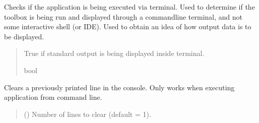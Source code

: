 \documentclass[letterpaper,10pt,english]{sphinxmanual}
\begin{document}
\begin{fulllineitems}
\label{\detokenize{modules/simulation/display:qnav.simulation.display.is_using_terminal}}
\pysigstartsignatures
{}
\pysigstopsignatures
\sphinxAtStartPar
Checks if the application is being executed via terminal.
Used to determine if the toolbox is being run and displayed through a
command\sphinxhyphen{}line terminal, and not some interactive shell (or IDE). Used to
obtain an idea of how output data is to be displayed.
\begin{quote}\begin{description}
\sphinxAtStartPar
True if standard output is being displayed inside terminal.

\sphinxAtStartPar
bool

\end{description}\end{quote}

\end{fulllineitems}


\begin{fulllineitems}
\label{\detokenize{modules/simulation/display:qnav.simulation.display.clear_terminal_line}}
\pysigstartsignatures
{}
\pysigstopsignatures
\sphinxAtStartPar
Clears a previously printed line in the console.
Only works when executing application from command line.
\begin{quote}\begin{description}
\sphinxAtStartPar
{} () \textendash{} Number of lines to clear (default = 1).

\end{description}\end{quote}

\end{fulllineitems}
\end{document}
